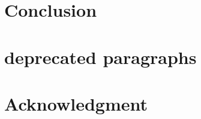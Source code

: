 \section{Conclusion}


\section{deprecated paragraphs}


\section*{Acknowledgment}



\label{sec:appendix}






%

